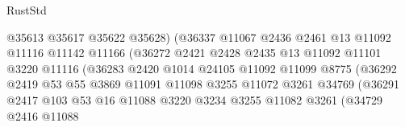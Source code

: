 \begin{lexlean}{RustStd}
\begin{coremodule}
                                      @35613
                                      @35617
                                      @35622
                                      @35628)
                                    (@36337
                                      @11067
                                      @2436
                                      @2461
                                      @13
                                      @11092
                                      @11116
                                      @11142
                                      @11166
                                      (@36272
                                        @2421
                                        @2428
                                        @2435
                                        @13
                                        @11092
                                        @11101
                                        @3220
                                        @11116
                                        (@36283
                                          @2420
                                          @1014
                                          @24105
                                          @11092
                                          @11099
                                          @8775
                                          (@36292
                                            @2419
                                            @53
                                            @55
                                            @3869
                                            @11091
                                            @11098
                                            @3255
                                            @11072
                                            @3261
                                            @34769
                                            (@36291
                                              @2417
                                              @103
                                              @53
                                              @16
                                              @11088
                                              @3220
                                              @3234
                                              @3255
                                              @11082
                                              @3261
                                              (@34729
                                                @2416
                                                @11088

\end{coremodule}
\end{lexlean}
